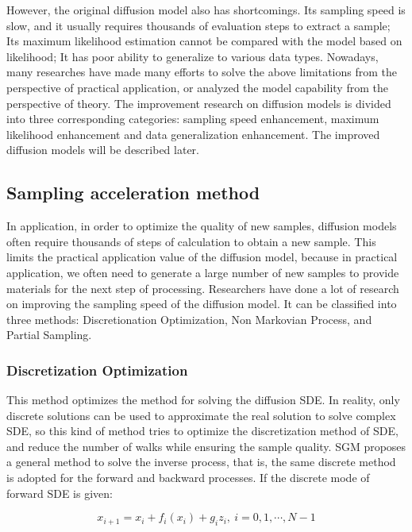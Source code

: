 \documentclass[conference]{IEEEtran}
\begin{document}
However, the original diffusion model also has shortcomings. Its sampling speed is slow, and it usually requires thousands of evaluation steps to extract a sample; Its maximum likelihood estimation cannot be compared with the model based on likelihood; It has poor ability to generalize to various data types. Nowadays, many researches have made many efforts to solve the above limitations from the perspective of practical application, or analyzed the model capability from the perspective of theory. The improvement research on diffusion models is divided into three corresponding categories: sampling speed enhancement, maximum likelihood enhancement and data generalization enhancement. The improved diffusion models will be described later.

\subsection{Sampling acceleration method}

In application, in order to optimize the quality of new samples, diffusion models often require thousands of steps of calculation to obtain a new sample. This limits the practical application value of the diffusion model, because in practical application, we often need to generate a large number of new samples to provide materials for the next step of processing. Researchers have done a lot of research on improving the sampling speed of the diffusion model. It can be classified into three methods: Discretionation Optimization, Non Markovian Process, and Partial Sampling.

\subsubsection{Discretization Optimization}\quad

This method optimizes the method for solving the diffusion SDE. In reality, only discrete solutions can be used to approximate the real solution to solve complex SDE, so this kind of method tries to optimize the discretization method of SDE, and reduce the number of walks while ensuring the sample quality. SGM proposes a general method to solve the inverse process, that is, the same discrete method is adopted for the forward and backward processes. If the discrete mode of forward SDE is given:

\begin{equation}
    x_{i+1}=x_i+f_i(x_i)+g_iz_i,\ i=0,1,\cdots,N-1
\end{equation}
\end{document}
